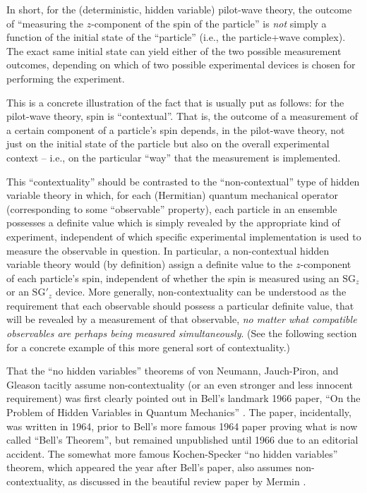 \documentclass[aps,prc,onecolumn,letterpaper,floatfix,12pt]{revtex4}
\begin{document}
In short, for the (deterministic, hidden variable) pilot-wave theory, 
the outcome of ``measuring the $z$-component of the spin of the
particle'' is \emph{not} simply a function of the initial state of the
``particle'' (i.e., the particle+wave complex).  The exact same
initial state can yield either of the two possible
measurement outcomes, depending on which of two possible experimental
devices is chosen for performing the experiment.  

This is a concrete illustration of the fact that is usually put as
follows:  for the pilot-wave theory, spin is ``contextual''.  That is,
the outcome of a measurement of a certain component of a particle's
spin depends, in the pilot-wave theory, not just on the initial state
of the particle but also on the overall experimental context -- i.e.,
on the particular ``way'' that the measurement is implemented.  

This ``contextuality'' should be contrasted to the ``non-contextual''
type of hidden variable theory in which, for each (Hermitian) 
quantum mechanical operator (corresponding to some ``observable''
property), each particle in an ensemble possesses a definite value
which is simply revealed by the appropriate kind of experiment,
independent of which specific experimental implementation is used to
measure the observable in question.  In particular,  a
non-contextual hidden variable theory would (by definition) assign a
definite value to the $z$-component of each particle's spin,
independent of whether the spin is measured using an $\text{SG}_z$ or
an $\text{SG}'_z$ device.  More generally, non-contextuality can be
understood as the requirement that each observable should possess a
particular definite value, that will be revealed by a measurement of
that observable, \emph{no matter what compatible observables are
  perhaps being measured simultaneously}.  (See the following section
for a concrete example of this more general sort of contextuality.)

That the ``no hidden variables'' theorems of von Neumann, Jauch-Piron,
and Gleason tacitly assume non-contextuality (or an even stronger and
less innocent requirement) was first clearly pointed out in Bell's
landmark 1966 paper, ``On the Problem of Hidden Variables in Quantum
Mechanics'' \cite{bell66}. The paper, incidentally, was written in
1964, prior to Bell's more famous 1964 paper proving what is now
called ``Bell's Theorem'', but remained unpublished until 1966 
due to an editorial
accident.  The somewhat more famous Kochen-Specker ``no hidden
variables'' theorem, which appeared the year after Bell's paper, also
assumes non-contextuality, as discussed in the beautiful review
paper by Mermin \cite{ks, mermin}.  
\end{document}
